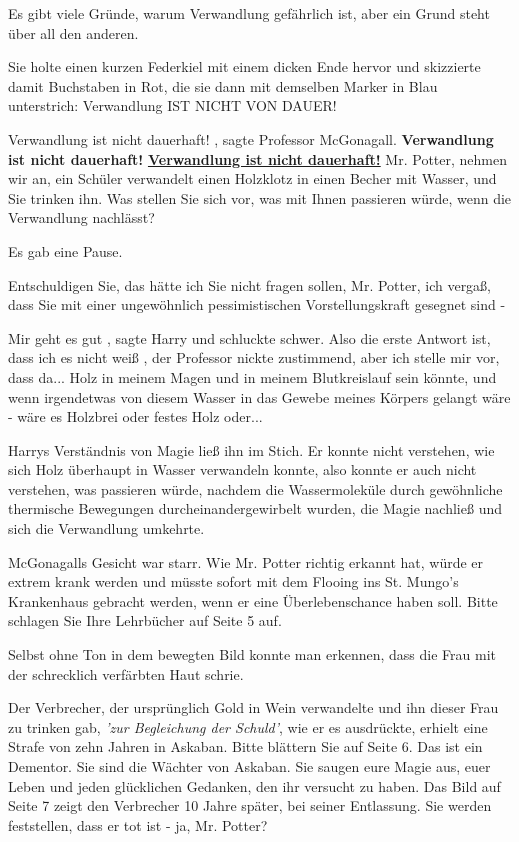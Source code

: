 \glqq Es gibt viele Gründe, warum Verwandlung gefährlich ist, aber ein Grund
steht über all den anderen.\grqq{}

Sie holte einen kurzen Federkiel mit einem dicken Ende hervor und skizzierte
damit Buchstaben in Rot, die sie dann mit demselben Marker in Blau unterstrich:
Verwandlung IST NICHT VON DAUER!

\glqq Verwandlung ist nicht dauerhaft!\grqq{} , sagte Professor McGonagall.
\glqq \textbf{Verwandlung ist nicht dauerhaft!} \textbf{\underline{ Verwandlung
ist nicht dauerhaft!}} Mr. Potter, nehmen wir an, ein Schüler verwandelt einen
Holzklotz in einen Becher mit Wasser, und Sie trinken ihn. Was stellen Sie sich
vor, was mit Ihnen passieren würde, wenn die Verwandlung nachlässt?\grqq{}

Es gab eine Pause.

\glqq Entschuldigen Sie, das hätte ich Sie nicht fragen sollen, Mr. Potter, ich
vergaß, dass Sie mit einer ungewöhnlich pessimistischen Vorstellungskraft
gesegnet sind -\grqq{}

\glqq Mir geht es gut\grqq{} , sagte Harry und schluckte schwer. \glqq Also die
erste Antwort ist, dass ich es nicht weiß\grqq{} , der Professor nickte
zustimmend, \glqq aber ich stelle mir vor, dass da... Holz in meinem Magen und
in meinem Blutkreislauf sein könnte, und wenn irgendetwas von diesem Wasser in
das Gewebe meines Körpers gelangt wäre - wäre es Holzbrei oder festes Holz
oder...\grqq{}

Harrys Verständnis von Magie ließ ihn im Stich. Er konnte nicht verstehen, wie
sich Holz überhaupt in Wasser verwandeln konnte, also konnte er auch nicht
verstehen, was passieren würde, nachdem die Wassermoleküle durch gewöhnliche
thermische Bewegungen durcheinandergewirbelt wurden, die Magie nachließ und sich
die Verwandlung umkehrte.

McGonagalls Gesicht war starr. \glqq Wie Mr. Potter richtig erkannt hat, würde
er extrem krank werden und müsste sofort mit dem Flooing ins St. Mungo's
Krankenhaus gebracht werden, wenn er eine Überlebenschance haben soll. Bitte
schlagen Sie Ihre Lehrbücher auf Seite 5 auf.\grqq{}

Selbst ohne Ton in dem bewegten Bild konnte man erkennen, dass die Frau mit der
schrecklich verfärbten Haut schrie.

\glqq Der Verbrecher, der ursprünglich Gold in Wein verwandelte und ihn dieser
Frau zu trinken gab, \emph{'zur Begleichung der Schuld'}, wie er es ausdrückte,
erhielt eine Strafe von zehn Jahren in Askaban. Bitte blättern Sie auf Seite 6.
Das ist ein Dementor. Sie sind die Wächter von Askaban. Sie saugen eure Magie
aus, euer Leben und jeden glücklichen Gedanken, den ihr versucht zu haben. Das
Bild auf Seite 7 zeigt den Verbrecher 10 Jahre später, bei seiner Entlassung.
Sie werden feststellen, dass er tot ist - ja, Mr. Potter?\grqq{}

